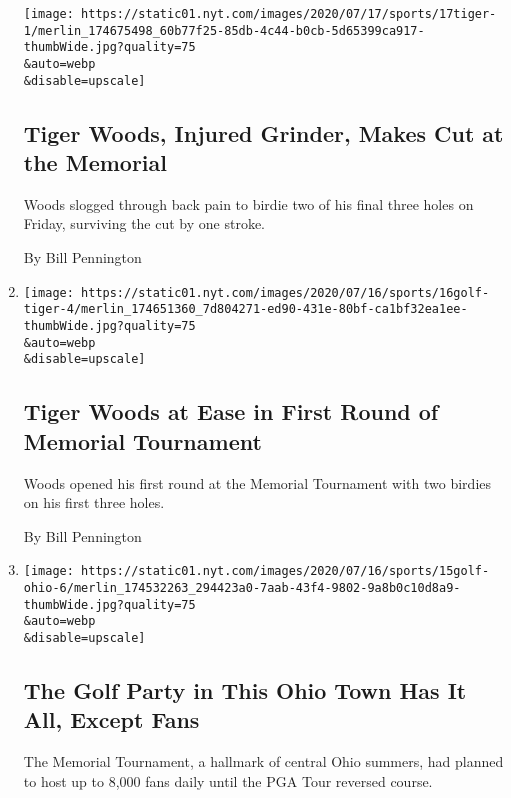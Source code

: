 \begin{enumerate}
  \texttt{[image: https://static01.nyt.com/images/2020/07/17/sports/17tiger-1/merlin\_174675498\_60b77f25-85db-4c44-b0cb-5d65399ca917-thumbWide.jpg?quality=75\\\&auto=webp\\\&disable=upscale]}

  \hypertarget{tiger-woods-injured-grinder-makes-cut-at-the-memorial}{%
  \subsection{Tiger Woods, Injured Grinder, Makes Cut at the
  Memorial}\label{tiger-woods-injured-grinder-makes-cut-at-the-memorial}}

  Woods slogged through back pain to birdie two of his final three holes
  on Friday, surviving the cut by one stroke.

  By Bill Pennington
\item
  \href{/2020/07/16/sports/golf/tiger-woods-memorial-tournament-pga.html}{}

  \texttt{[image: https://static01.nyt.com/images/2020/07/16/sports/16golf-tiger-4/merlin\_174651360\_7d804271-ed90-431e-80bf-ca1bf32ea1ee-thumbWide.jpg?quality=75\\\&auto=webp\\\&disable=upscale]}

  \hypertarget{tiger-woods-at-ease-in-first-round-of-memorial-tournament}{%
  \subsection{Tiger Woods at Ease in First Round of Memorial
  Tournament}\label{tiger-woods-at-ease-in-first-round-of-memorial-tournament}}

  Woods opened his first round at the Memorial Tournament with two
  birdies on his first three holes.

  By Bill Pennington
\item
  \href{/2020/07/15/sports/golf/memorial-tournament-ohio-fans.html}{}

  \texttt{[image: https://static01.nyt.com/images/2020/07/16/sports/15golf-ohio-6/merlin\_174532263\_294423a0-7aab-43f4-9802-9a8b0c10d8a9-thumbWide.jpg?quality=75\\\&auto=webp\\\&disable=upscale]}

  \hypertarget{the-golf-party-in-this-ohio-town-has-it-all-except-fans}{%
  \subsection{The Golf Party in This Ohio Town Has It All, Except
  Fans}\label{the-golf-party-in-this-ohio-town-has-it-all-except-fans}}

  The Memorial Tournament, a hallmark of central Ohio summers, had
  planned to host up to 8,000 fans daily until the PGA Tour reversed
  course.


\end{enumerate}
